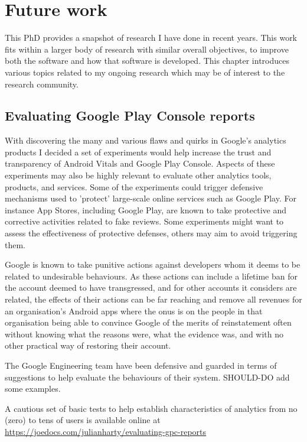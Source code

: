 \chapter{Future work}
This PhD provides a snapshot of research I have done in recent years. This work fits within a larger body of research with similar overall objectives, to improve both the software and how that software is developed. This chapter introduces various topics related to my ongoing research which may be of interest to the research community.

\section{Evaluating Google Play Console reports}
With discovering the many and various flaws and quirks in Google's analytics products I decided a set of experiments would help increase the trust and transparency of Android Vitals and Google Play Console. Aspects of these experiments may also be highly relevant to evaluate other analytics tools, products, and services. Some of the experiments could trigger defensive mechanisms used to 'protect' large-scale online services such as Google Play. For instance App Stores, including Google Play, are known to take protective and corrective activities related to fake reviews. Some experiments might want to assess the effectiveness of protective defenses, others may aim to avoid triggering them. 

Google is known to take punitive actions against developers whom it deems to be related to undesirable behaviours. %
As these actions can include a lifetime ban for the account deemed to have transgressed, and for other accounts it considers are related, the effects of their actions can be far reaching and remove all revenues for an organisation's Android apps where the onus is on the people in that organisation being able to convince Google of the merits of reinstatement often without knowing what the reasons were, what the evidence was, and with no other practical way of restoring their account.

The Google Engineering team have been defensive and guarded in terms of suggestions to help evaluate the behaviours of their system. SHOULD-DO add some examples. 

A cautious set of basic tests to help establish characteristics of analytics from no (zero) to tens of users is available online at 
\url{https://joedocs.com/julianharty/evaluating-gpc-reports}

